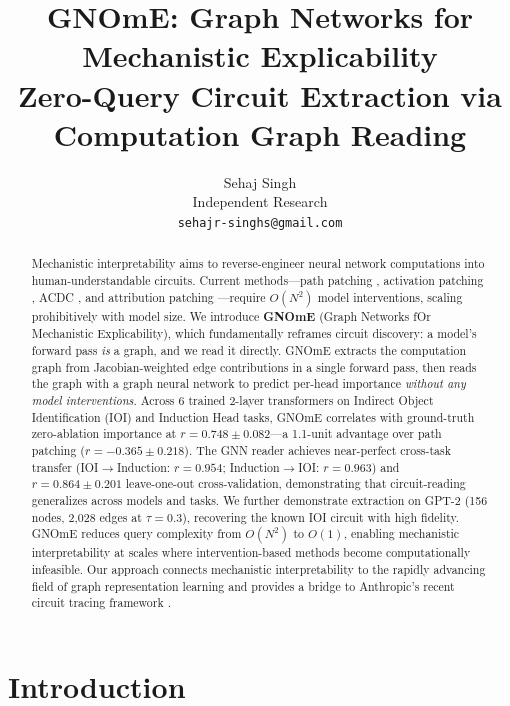 \documentclass[11pt,a4paper]{article}
\title{\textbf{GNOmE: Graph Networks for Mechanistic Explicability}\\[6pt]
\large Zero-Query Circuit Extraction via Computation Graph Reading}
\author{Sehaj Singh\\
Independent Research\\
\texttt{sehajr-singhs@gmail.com}
}
\date{}
\begin{document}
\maketitle

\begin{abstract}
Mechanistic interpretability aims to reverse-engineer neural network computations into human-understandable circuits. Current methods---path patching \cite{goldowsky2023localizing,wang2023interpretability}, activation patching \cite{geiger2021causal,meng2022locating}, ACDC \cite{conmy2023automated}, and attribution patching \cite{nanda2023attribution}---require $O(N^2)$ model interventions, scaling prohibitively with model size. We introduce \textbf{GNOmE} (Graph Networks fOr Mechanistic Explicability), which fundamentally reframes circuit discovery: a model's forward pass \emph{is} a graph, and we read it directly. GNOmE extracts the computation graph from Jacobian-weighted edge contributions in a single forward pass, then reads the graph with a graph neural network to predict per-head importance \emph{without any model interventions}. Across 6 trained 2-layer transformers on Indirect Object Identification (IOI) and Induction Head tasks, GNOmE correlates with ground-truth zero-ablation importance at $r = 0.748 \pm 0.082$---a 1.1-unit advantage over path patching ($r = -0.365 \pm 0.218$). The GNN reader achieves near-perfect cross-task transfer (IOI$\to$Induction: $r = 0.954$; Induction$\to$IOI: $r = 0.963$) and $r = 0.864 \pm 0.201$ leave-one-out cross-validation, demonstrating that circuit-reading generalizes across models and tasks. We further demonstrate extraction on GPT-2 (156 nodes, 2,028 edges at $\tau = 0.3$), recovering the known IOI circuit with high fidelity. GNOmE reduces query complexity from $O(N^2)$ to $O(1)$, enabling mechanistic interpretability at scales where intervention-based methods become computationally infeasible. Our approach connects mechanistic interpretability to the rapidly advancing field of graph representation learning \cite{velickovic2018gat,kipf2017semi,xu2019powerful} and provides a bridge to Anthropic's recent circuit tracing framework \cite{anthropic2025circuit}.
\end{abstract}

\section{Introduction}
\end{document}
